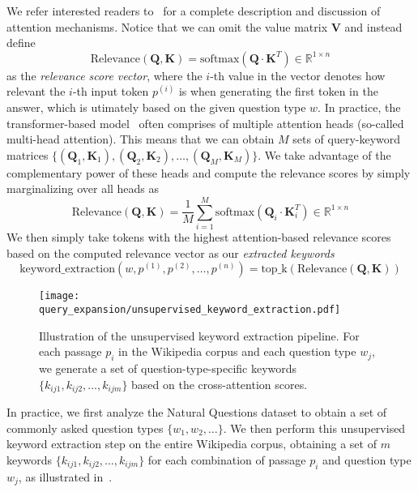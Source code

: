 %
We refer interested readers to~\citet{vaswani2017attention} for a complete description and discussion of attention mechanisms.
%
Notice that we can omit the value matrix $\mathbf{V}$ and instead define
\begin{equation}
\text{Relevance}(\mathbf{Q}, \mathbf{K}) = \text{softmax}(\mathbf{Q} \cdot \mathbf{K}^{T}) \in \mathbb{R}^{1 \times n}
\end{equation}
%
as the \emph{relevance score vector}, where the $i$-th value in the vector denotes how relevant the $i$-th input token $p^{(i)}$ is when generating the first token in the answer, which is utimately based on the given question type $w$.
%
In practice, the transformer-based model~\cite{vaswani2017attention} often comprises of multiple attention heads (so-called multi-head attention).
%
This means that we can obtain $M$ sets of query-keyword matrices $\{(\mathbf{Q}_1, \mathbf{K}_1), (\mathbf{Q}_2, \mathbf{K}_2), \ldots, (\mathbf{Q}_M, \mathbf{K}_M)\}$.
%
We take advantage of the complementary power of these heads and compute the relevance scores by simply marginalizing over all heads as
%
\begin{equation}
\text{Relevance}(\mathbf{Q}, \mathbf{K}) = \frac{1}{M} \sum_{i=1}^{M} \text{softmax}(\mathbf{Q}_i \cdot \mathbf{K}^{T}_i) \in \mathbb{R}^{1 \times n}
\end{equation}
%
We then simply take tokens with the highest attention-based relevance scores based on the computed relevance vector as our \emph{extracted keywords}
%
\begin{equation}
\text{keyword\_extraction}(w, p^{(1)}, p^{(2)}, \ldots, p^{(n)}) = \text{top\_k}(\text{Relevance}(\mathbf{Q}, \mathbf{K}))
\end{equation}

\begin{figure}[!htbp]
	\centering
	\texttt{[image: query\_expansion/unsupervised\_keyword\_extraction.pdf]}
	\caption[Illustration of the unsupervised keyword extraction pipeline.]{
		Illustration of the unsupervised keyword extraction pipeline.
		For each passage $p_i$ in the Wikipedia corpus and each question type $w_j$, we generate a set of question-type-specific keywords $\{k_{ij1}, k_{ij2}, \ldots, k_{ijm}\}$ based on the cross-attention scores.
	}
	\label{fig:unsupervised_keyword_extraction_pipeline}
\end{figure}

%
In practice, we first analyze the Natural Questions dataset to obtain a set of commonly asked question types $\{w_1, w_2, \ldots\}$.
%
We then perform this unsupervised keyword extraction step on the entire Wikipedia corpus, obtaining a set of $m$ keywords $\{k_{ij1}, k_{ij2}, \ldots, k_{ijm}\}$ for each combination of passage $p_i$ and question type $w_j$, as illustrated in~.


